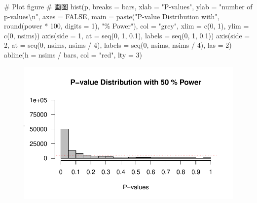 \documentclass[
  letterpaper,
  DIV=11,
  numbers=noendperiod]{scrreprt}
\newenvironment{Shaded}{\begin{snugshade}}{\end{snugshade}}
\newcommand{\AttributeTok}[1]{\textcolor[rgb]{0.40,0.45,0.13}{#1}}
\newcommand{\CommentTok}[1]{\textcolor[rgb]{0.37,0.37,0.37}{#1}}
\newcommand{\ConstantTok}[1]{\textcolor[rgb]{0.56,0.35,0.01}{#1}}
\newcommand{\DecValTok}[1]{\textcolor[rgb]{0.68,0.00,0.00}{#1}}
\newcommand{\FloatTok}[1]{\textcolor[rgb]{0.68,0.00,0.00}{#1}}
\newcommand{\FunctionTok}[1]{\textcolor[rgb]{0.28,0.35,0.67}{#1}}
\newcommand{\NormalTok}[1]{\textcolor[rgb]{0.00,0.23,0.31}{#1}}
\newcommand{\SpecialCharTok}[1]{\textcolor[rgb]{0.37,0.37,0.37}{#1}}
\newcommand{\StringTok}[1]{\textcolor[rgb]{0.13,0.47,0.30}{#1}}
\begin{document}
\begin{Shaded}
\begin{Highlighting}[]
\CommentTok{\# Plot figure \# 画图}
\FunctionTok{hist}\NormalTok{(p,}
  \AttributeTok{breaks =}\NormalTok{ bars, }\AttributeTok{xlab =} \StringTok{"P{-}values"}\NormalTok{, }\AttributeTok{ylab =} \StringTok{"number of p{-}values}\SpecialCharTok{\textbackslash{}n}\StringTok{"}\NormalTok{, }
  \AttributeTok{axes =} \ConstantTok{FALSE}\NormalTok{, }\AttributeTok{main =} \FunctionTok{paste}\NormalTok{(}\StringTok{"P{-}value Distribution with"}\NormalTok{, }
                             \FunctionTok{round}\NormalTok{(power }\SpecialCharTok{*} \DecValTok{100}\NormalTok{, }\AttributeTok{digits =} \DecValTok{1}\NormalTok{), }\StringTok{"\% Power"}\NormalTok{),}
  \AttributeTok{col =} \StringTok{"grey"}\NormalTok{, }\AttributeTok{xlim =} \FunctionTok{c}\NormalTok{(}\DecValTok{0}\NormalTok{, }\DecValTok{1}\NormalTok{), }\AttributeTok{ylim =} \FunctionTok{c}\NormalTok{(}\DecValTok{0}\NormalTok{, nsims))}
\FunctionTok{axis}\NormalTok{(}\AttributeTok{side =} \DecValTok{1}\NormalTok{, }\AttributeTok{at =} \FunctionTok{seq}\NormalTok{(}\DecValTok{0}\NormalTok{, }\DecValTok{1}\NormalTok{, }\FloatTok{0.1}\NormalTok{), }\AttributeTok{labels =} \FunctionTok{seq}\NormalTok{(}\DecValTok{0}\NormalTok{, }\DecValTok{1}\NormalTok{, }\FloatTok{0.1}\NormalTok{))}
\FunctionTok{axis}\NormalTok{(}\AttributeTok{side =} \DecValTok{2}\NormalTok{, }\AttributeTok{at =} \FunctionTok{seq}\NormalTok{(}\DecValTok{0}\NormalTok{, nsims, nsims }\SpecialCharTok{/} \DecValTok{4}\NormalTok{), }
     \AttributeTok{labels =} \FunctionTok{seq}\NormalTok{(}\DecValTok{0}\NormalTok{, nsims, nsims }\SpecialCharTok{/} \DecValTok{4}\NormalTok{), }\AttributeTok{las =} \DecValTok{2}\NormalTok{)}
\FunctionTok{abline}\NormalTok{(}\AttributeTok{h =}\NormalTok{ nsims }\SpecialCharTok{/}\NormalTok{ bars, }\AttributeTok{col =} \StringTok{"red"}\NormalTok{, }\AttributeTok{lty =} \DecValTok{3}\NormalTok{)}
\end{Highlighting}
\end{Shaded}

\begin{figure}[H]

{\centering \includegraphics[width=1\textwidth,height=\textheight]{01-pvalue_files/figure-pdf/q1-1.pdf}

}

\end{figure}
\end{document}
